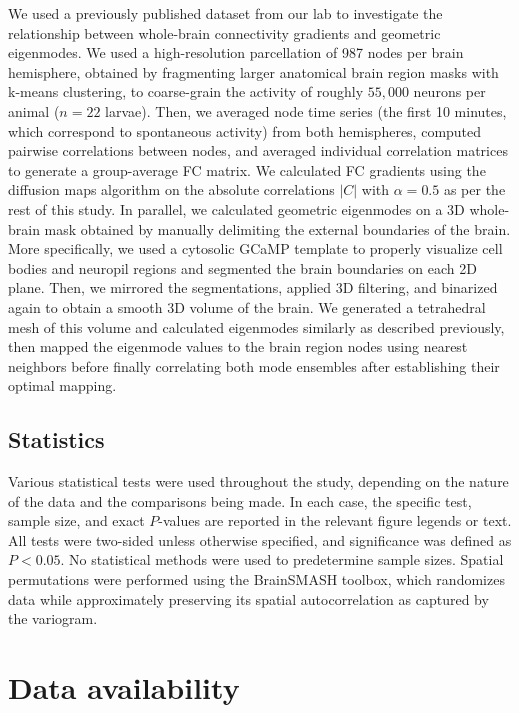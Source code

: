 \documentclass{article}
\begin{document}
We used a previously published dataset from our lab\cite{legare2025structural} to investigate the relationship between whole-brain connectivity gradients and geometric eigenmodes. We used a high-resolution parcellation of 987 nodes per brain hemisphere, obtained by fragmenting larger anatomical brain region masks with k-means clustering, to coarse-grain the activity of roughly $55,000$ neurons per animal ($n=22$ larvae). Then, we averaged node time series (the first 10 minutes, which correspond to spontaneous activity) from both hemispheres, computed pairwise correlations between nodes, and averaged individual correlation matrices to generate a group-average FC matrix. We calculated FC gradients using the diffusion maps algorithm on the absolute correlations $|C|$ with $\alpha=0.5$ as per the rest of this study. In parallel, we calculated geometric eigenmodes on a 3D whole-brain mask obtained by manually delimiting the external boundaries of the brain. More specifically, we used a cytosolic GCaMP template to properly visualize cell bodies and neuropil regions and segmented the brain boundaries on each 2D plane. Then, we mirrored the segmentations, applied 3D filtering, and binarized again to obtain a smooth 3D volume of the brain. We generated a tetrahedral mesh of this volume and calculated eigenmodes similarly as described previously, then mapped the eigenmode values to the brain region nodes using nearest neighbors before finally correlating both mode ensembles after establishing their optimal mapping.

\subsection*{Statistics}

Various statistical tests were used throughout the study, depending on the nature of the data and the comparisons being made. In each case, the specific test, sample size, and exact $P$-values are reported in the relevant figure legends or text. All tests were two-sided unless otherwise specified, and significance was defined as $P<0.05$. No statistical methods were used to predetermine sample sizes. Spatial permutations were performed using the BrainSMASH toolbox, which randomizes data while approximately preserving its spatial autocorrelation as captured by the variogram.

\section*{Data availability}
\end{document}
